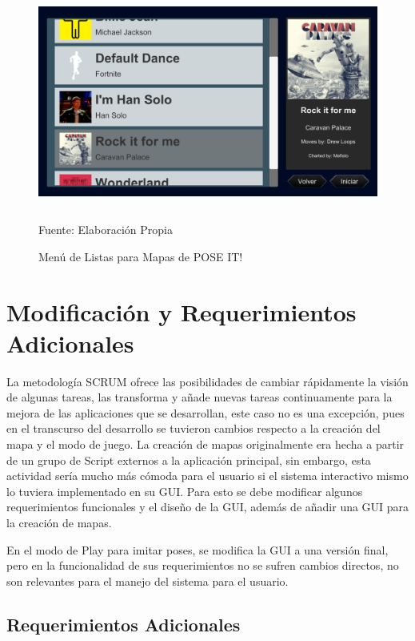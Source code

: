 \begin{figure}[t!]
	\centering
	\includegraphics[width=12cm,height=7cm]{./Images/menudelistas.png}
	\caption{Menú de Listas para Mapas de POSE IT!}
	\footnotesize Fuente: Elaboración Propia
	\label{menulistas}
\end{figure}

\section{Modificación y Requerimientos Adicionales}

La metodología SCRUM ofrece las posibilidades de cambiar rápidamente la visión de algunas tareas, las transforma y añade nuevas tareas continuamente para la mejora de las aplicaciones que se desarrollan, este caso no es una excepción, pues en el transcurso del desarrollo se tuvieron cambios respecto a la creación del mapa y el modo de juego. La creación de mapas originalmente era hecha a partir de un grupo de Script externos a la aplicación principal, sin embargo, esta actividad sería mucho más cómoda para el usuario si el sistema interactivo mismo lo tuviera implementado en su GUI. Para esto se debe modificar algunos requerimientos funcionales y el diseño de la GUI, además de añadir una GUI para la creación de mapas.

En el modo de Play para imitar poses, se modifica la GUI a una versión final, pero en la funcionalidad de sus requerimientos no se sufren cambios directos, no son relevantes para el manejo del sistema para el usuario.


\subsection{Requerimientos Adicionales}

